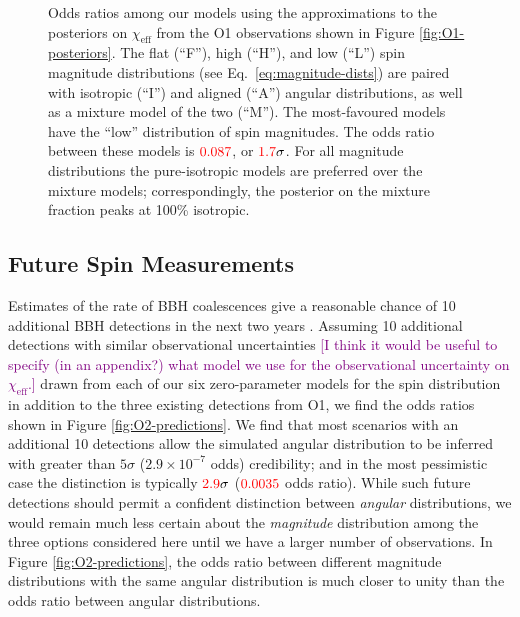 \documentclass[modern,linenumbers]{aastex61}
\newcommand{\chieff}{\chi_\mathrm{eff}}
\newcommand{\checkme}[1]{\textcolor{red}{#1}}
\newcommand{\OOneSigmaIsoAligned}{\checkme{1.7}}
\newcommand{\OOneOddsIsoAligned}{\checkme{0.087}}
\newcommand{\OTwoSigmaIsoAlignedMin}{\checkme{2.9}}
\newcommand{\OTwoOddsIsoAlignedMin}{\checkme{0.0035}}
\newcommand{\ilya}[1]{\textcolor{purple}{#1}}
\begin{document}
\begin{figure}
  \caption{Odds ratios among our models using the approximations to
    the posteriors on $\chieff$ from the O1 observations shown in
    Figure \ref{fig:O1-posteriors}.  The flat (``F''), high (``H''),
    and low (``L'') spin magnitude distributions (see Eq.\
    \eqref{eq:magnitude-dists}) are paired with isotropic (``I'') and
    aligned (``A'') angular distributions, as well as a mixture model
    of the two (``$\mathrm{M}$'').  The most-favoured models have the
    ``low'' distribution of spin magnitudes.  The odds ratio between
    these models is $\OOneOddsIsoAligned$, or
    $\OOneSigmaIsoAligned\sigma$.  For all magnitude distributions the
    pure-isotropic models are preferred over the mixture models;
    correspondingly, the posterior on the mixture fraction peaks at
    100\% isotropic.}
  \label{fig:O1-odds}
\end{figure}

\subsection{Future Spin Measurements}
\label{subsec:future}

Estimates of the rate of \ac{BBH} coalescences give a reasonable
chance of 10 additional \ac{BBH} detections in the next two years
\citep{O1-BBH,2016ApJ...833L...1A,2016ApJS..227...14A}.  Assuming 10
additional detections with similar observational uncertainties
\ilya{[I think it would be useful to specify (in an appendix?) what
  model we use for the observational uncertainty on $\chieff$.]}
drawn from each of our six zero-parameter models for the spin
distribution in addition to the three existing detections from
O1, we find the odds ratios shown in Figure
\ref{fig:O2-predictions}.  We find that most scenarios with an
additional 10 detections allow the simulated angular distribution to
be inferred with greater than $5\sigma$ ($2.9 \times 10^{-7}$ odds)
credibility; and in the most pessimistic case the distinction is
typically $\OTwoSigmaIsoAlignedMin\sigma$ ($\OTwoOddsIsoAlignedMin$
odds ratio).  While such future detections should permit a confident
distinction between \emph{angular} distributions, we would remain much
less certain about the \emph{magnitude} distribution among the three
options considered here until we have a larger number of observations.
In Figure \ref{fig:O2-predictions}, the odds ratio between different
magnitude distributions with the same angular distribution is much
closer to unity than the odds ratio between angular distributions.
\end{document}
